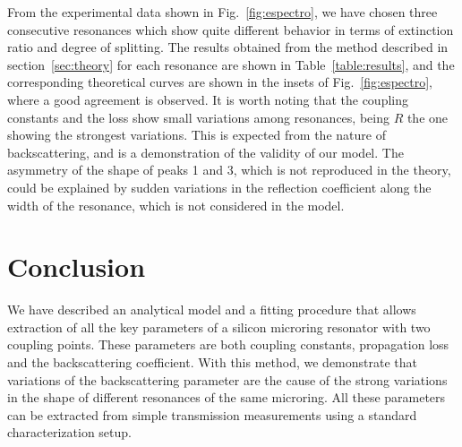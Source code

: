 \documentclass[10pt,letterpaper]{article}
\begin{document}
From the experimental data shown in Fig.~\ref{fig:espectro}, we have chosen three consecutive resonances which show quite different behavior in terms of extinction ratio and degree of splitting. The results obtained from the method described in section~\ref{sec:theory} for each resonance are shown in Table~\ref{table:results}, and the corresponding theoretical curves are shown in the insets of Fig.~\ref{fig:espectro}, where a good agreement is observed. It is worth noting that the coupling constants and the loss show small variations among resonances, being $R$ the one showing the strongest variations. This is expected from the nature of backscattering, and is a demonstration of the validity of our model. The asymmetry of the shape of peaks 1 and 3, which is not reproduced in the theory, could be explained by sudden variations in the reflection coefficient along the width of the resonance, which is not considered in the model.



\section{Conclusion}
We have described an analytical model and a fitting procedure that allows extraction of all the key parameters of a silicon microring resonator with two coupling points. These parameters are both coupling constants, propagation loss and the backscattering coefficient. With this method, we demonstrate that variations of the backscattering parameter are the cause of the strong variations in the shape of different resonances of the same microring. All these parameters can be extracted from simple transmission measurements using a standard characterization setup.
\end{document}
